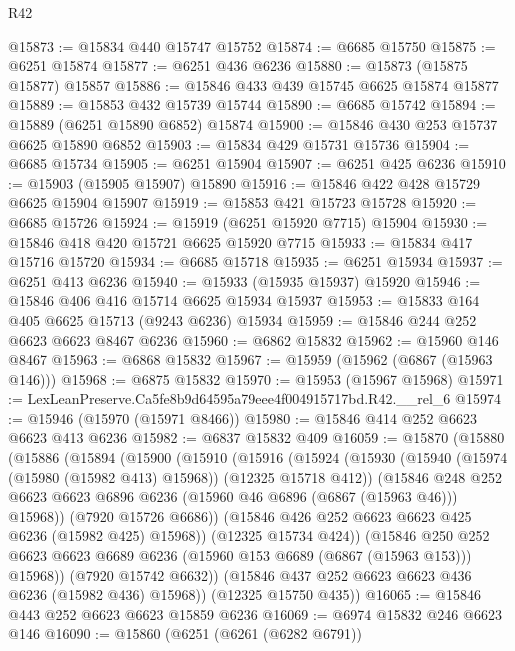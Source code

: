 \begin{lexlean}{R42}
\begin{coremodule}
{@15873 := @15834 @440 @15747 @15752
@15874 := @6685 @15750
@15875 := @6251 @15874
@15877 := @6251 @436 @6236
@15880 := @15873 (@15875 @15877) @15857
@15886 := @15846 @433 @439 @15745 @6625 @15874 @15877
@15889 := @15853 @432 @15739 @15744
@15890 := @6685 @15742
@15894 := @15889 (@6251 @15890 @6852) @15874
@15900 := @15846 @430 @253 @15737 @6625 @15890 @6852
@15903 := @15834 @429 @15731 @15736
@15904 := @6685 @15734
@15905 := @6251 @15904
@15907 := @6251 @425 @6236
@15910 := @15903 (@15905 @15907) @15890
@15916 := @15846 @422 @428 @15729 @6625 @15904 @15907
@15919 := @15853 @421 @15723 @15728
@15920 := @6685 @15726
@15924 := @15919 (@6251 @15920 @7715) @15904
@15930 := @15846 @418 @420 @15721 @6625 @15920 @7715
@15933 := @15834 @417 @15716 @15720
@15934 := @6685 @15718
@15935 := @6251 @15934
@15937 := @6251 @413 @6236
@15940 := @15933 (@15935 @15937) @15920
@15946 := @15846 @406 @416 @15714 @6625 @15934 @15937
@15953 := @15833 @164 @405 @6625 @15713 (@9243 @6236) @15934
@15959 := @15846 @244 @252 @6623 @6623 @8467 @6236
@15960 := @6862 @15832
@15962 := @15960 @146 @8467
@15963 := @6868 @15832
@15967 := @15959 (@15962 (@6867 (@15963 @146)))
@15968 := @6875 @15832
@15970 := @15953 (@15967 @15968)
@15971 := LexLeanPreserve.Ca5fe8b9d64595a79eee4f004915717bd.R42.__rel_6
@15974 := @15946 (@15970 (@15971 @8466))
@15980 := @15846 @414 @252 @6623 @6623 @413 @6236
@15982 := @6837 @15832 @409
@16059 := @15870
    (@15880
      (@15886
        (@15894
          (@15900
            (@15910
              (@15916
                (@15924
                  (@15930
                    (@15940 (@15974 (@15980 (@15982 @413) @15968)) (@12325 @15718 @412))
                    (@15846
                      @248
                      @252
                      @6623
                      @6623
                      @6896
                      @6236
                      (@15960 @46 @6896 (@6867 (@15963 @46)))
                      @15968))
                  (@7920 @15726 @6686))
                (@15846 @426 @252 @6623 @6623 @425 @6236 (@15982 @425) @15968))
              (@12325 @15734 @424))
            (@15846
              @250
              @252
              @6623
              @6623
              @6689
              @6236
              (@15960 @153 @6689 (@6867 (@15963 @153)))
              @15968))
          (@7920 @15742 @6632))
        (@15846 @437 @252 @6623 @6623 @436 @6236 (@15982 @436) @15968))
      (@12325 @15750 @435))
@16065 := @15846 @443 @252 @6623 @6623 @15859 @6236
@16069 := @6974 @15832 @246 @6623 @146
@16090 := @15860
    (@6251
      (@6261 (@6282 @6791))
}
\end{coremodule}
\end{lexlean}
